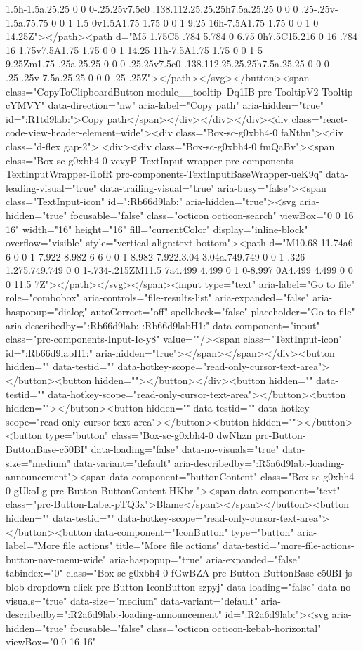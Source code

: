 {{{{{{{{{{{{{{{{{{{{{{{{{{{{{{{1.5h-1.5a.25.25 0 0 0-.25.25v7.5c0 .138.112.25.25.25h7.5a.25.25 0 0 0 .25-.25v-1.5a.75.75 0 0 1 1.5 0v1.5A1.75 1.75 0 0 1 9.25 16h-7.5A1.75 1.75 0 0 1 0 14.25Z"></path><path d="M5 1.75C5 .784 5.784 0 6.75 0h7.5C15.216 0 16 .784 16 1.75v7.5A1.75 1.75 0 0 1 14.25 11h-7.5A1.75 1.75 0 0 1 5 9.25Zm1.75-.25a.25.25 0 0 0-.25.25v7.5c0 .138.112.25.25.25h7.5a.25.25 0 0 0 .25-.25v-7.5a.25.25 0 0 0-.25-.25Z"></path></svg></button><span class="CopyToClipboardButton-module__tooltip--Dq1IB prc-TooltipV2-Tooltip-cYMVY" data-direction="nw" aria-label="Copy path" aria-hidden="true" id=":R1td9lab:">Copy path</span></div></div></div><div class="react-code-view-header-element--wide"><div class="Box-sc-g0xbh4-0 faNtbn"><div class="d-flex gap-2"> <div><div class="Box-sc-g0xbh4-0 fmQaBv"><span class="Box-sc-g0xbh4-0 vcvyP TextInput-wrapper prc-components-TextInputWrapper-i1ofR prc-components-TextInputBaseWrapper-ueK9q" data-leading-visual="true" data-trailing-visual="true" aria-busy="false"><span class="TextInput-icon" id=":Rb66d9lab:" aria-hidden="true"><svg aria-hidden="true" focusable="false" class="octicon octicon-search" viewBox="0 0 16 16" width="16" height="16" fill="currentColor" display="inline-block" overflow="visible" style="vertical-align:text-bottom"><path d="M10.68 11.74a6 6 0 0 1-7.922-8.982 6 6 0 0 1 8.982 7.922l3.04 3.04a.749.749 0 0 1-.326 1.275.749.749 0 0 1-.734-.215ZM11.5 7a4.499 4.499 0 1 0-8.997 0A4.499 4.499 0 0 0 11.5 7Z"></path></svg></span><input type="text" aria-label="Go to file" role="combobox" aria-controls="file-results-list" aria-expanded="false" aria-haspopup="dialog" autoCorrect="off" spellcheck="false" placeholder="Go to file" aria-describedby=":Rb66d9lab: :Rb66d9labH1:" data-component="input" class="prc-components-Input-Ic-y8" value=""/><span class="TextInput-icon" id=":Rb66d9labH1:" aria-hidden="true"></span></span></div><button hidden="" data-testid="" data-hotkey-scope="read-only-cursor-text-area"></button><button hidden=""></button></div><button hidden="" data-testid="" data-hotkey-scope="read-only-cursor-text-area"></button><button hidden=""></button><button hidden="" data-testid="" data-hotkey-scope="read-only-cursor-text-area"></button><button hidden=""></button><button type="button" class="Box-sc-g0xbh4-0 dwNhzn prc-Button-ButtonBase-c50BI" data-loading="false" data-no-visuals="true" data-size="medium" data-variant="default" aria-describedby=":R5a6d9lab:-loading-announcement"><span data-component="buttonContent" class="Box-sc-g0xbh4-0 gUkoLg prc-Button-ButtonContent-HKbr-"><span data-component="text" class="prc-Button-Label-pTQ3x">Blame</span></span></button><button hidden="" data-testid="" data-hotkey-scope="read-only-cursor-text-area"></button><button data-component="IconButton" type="button" aria-label="More file actions" title="More file actions" data-testid="more-file-actions-button-nav-menu-wide" aria-haspopup="true" aria-expanded="false" tabindex="0" class="Box-sc-g0xbh4-0 fGwBZA prc-Button-ButtonBase-c50BI js-blob-dropdown-click prc-Button-IconButton-szpyj" data-loading="false" data-no-visuals="true" data-size="medium" data-variant="default" aria-describedby=":R2a6d9lab:-loading-announcement" id=":R2a6d9lab:"><svg aria-hidden="true" focusable="false" class="octicon octicon-kebab-horizontal" viewBox="0 0 16 16" }}}}}}}}}}}}}}}}}}}}}}}}}}}}}}}
